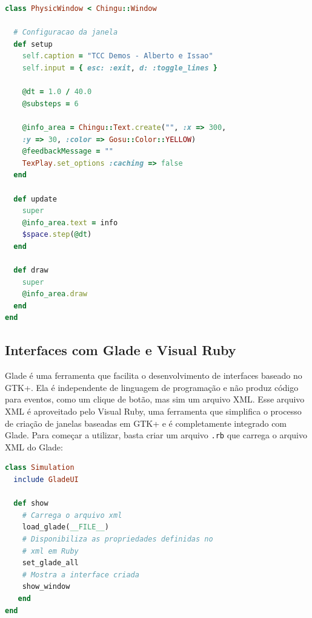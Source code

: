 \newpage
\begin{lstlisting}[language=Ruby, caption=physics.rb]
class PhysicWindow < Chingu::Window

  # Configuracao da janela
  def setup
    self.caption = "TCC Demos - Alberto e Issao"
    self.input = { esc: :exit, d: :toggle_lines }

    @dt = 1.0 / 40.0
    @substeps = 6

    @info_area = Chingu::Text.create("", :x => 300, 
	:y => 30, :color => Gosu::Color::YELLOW)    
    @feedbackMessage = ""
    TexPlay.set_options :caching => false
  end

  def update
    super
    @info_area.text = info
    $space.step(@dt)
  end

  def draw
    super
    @info_area.draw
  end
end
\end{lstlisting}

\subsection{Interfaces com Glade e Visual Ruby}
Glade é uma ferramenta que facilita o desenvolvimento de interfaces baseado no GTK+. Ela é independente de linguagem de programação
e não produz código para eventos, como um clique de botão, mas sim um arquivo XML. Esse arquivo XML é aproveitado pelo Visual Ruby, uma ferramenta que simplifica 
o processo de criação de janelas baseadas em GTK+ e é completamente integrado com Glade.
Para começar a utilizar, basta criar um arquivo {\tt .rb} que carrega o arquivo XML do Glade:

\newpage
\begin{lstlisting}[language=Ruby, caption=simulation.rb]
class Simulation
  include GladeUI

  def show
    # Carrega o arquivo xml
    load_glade(__FILE__)
    # Disponibiliza as propriedades definidas no 
    # xml em Ruby
    set_glade_all
    # Mostra a interface criada
    show_window
   end
end
\end{lstlisting}

